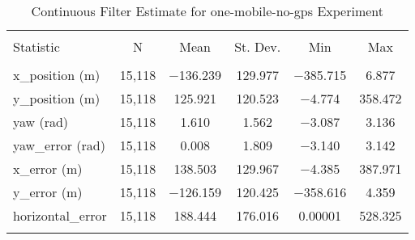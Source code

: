 
\begin{table}[h] \centering 
  \caption{Continuous Filter Estimate for one-mobile-no-gps Experiment} 
  \label{tab:one_mobile_no_gps_continuous_summary} 
\begin{tabular}{@{\extracolsep{5pt}}lccccc} 
\\[-1.8ex]\hline 
\hline \\[-1.8ex] 
Statistic & \multicolumn{1}{c}{N} & \multicolumn{1}{c}{Mean} & \multicolumn{1}{c}{St. Dev.} & \multicolumn{1}{c}{Min} & \multicolumn{1}{c}{Max} \\ 
\hline \\[-1.8ex] 
x\_position (m) & 15,118 & \num{-136.239} & \num{129.977} & \num{-385.715} & \num{6.877} \\ 
y\_position (m) & 15,118 & \num{125.921} & \num{120.523} & \num{-4.774} & \num{358.472} \\ 
yaw (rad) & 15,118 & \num{1.610} & \num{1.562} & \num{-3.087} & \num{3.136} \\ 
yaw\_error (rad) & 15,118 & \num{0.008} & \num{1.809} & \num{-3.140} & \num{3.142} \\ 
x\_error (m) & 15,118 & \num{138.503} & \num{129.967} & \num{-4.385} & \num{387.971} \\ 
y\_error (m) & 15,118 & \num{-126.159} & \num{120.425} & \num{-358.616} & \num{4.359} \\ 
horizontal\_error & 15,118 & \num{188.444} & \num{176.016} & \num{0.00001} & \num{528.325} \\ 
\hline \\[-1.8ex] 
\end{tabular} 
\end{table} 
